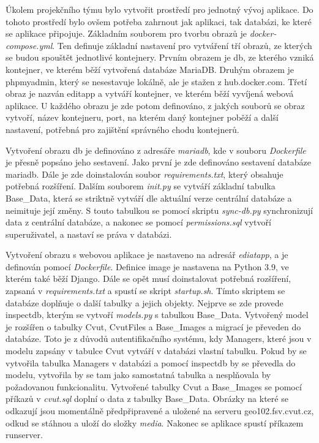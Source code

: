 Úkolem projekčního týmu bylo vytvořit prostředí pro jednotný vývoj
aplikace. Do tohoto prostředí bylo ovšem potřeba zahrnout jak aplikaci,
tak databázi, ke které se aplikace připojuje. Základním souborem pro
tvorbu obrazů je \emph{docker-compose.yml}. Ten definuje základní
nastavení pro vytváření tří obrazů, ze kterých se budou spouštět
jednotlivé kontejnery. Prvním obrazem je db, ze kterého vzniká
kontejner, ve kterém běží vytvořená databáze MariaDB. Druhým obrazem
je phpmyadmin, který se nesestavuje lokálně, ale je stažen z
hub.docker.com. Třetí obraz je nazván editapp a vytváří kontejner, ve
kterém běží vyvíjená webová aplikace. U každého obrazu je zde potom
definováno, z jakých souborů se obraz vytvoří, název kontejneru, port,
na kterém daný kontejner poběží a další nastavení, potřebná pro
zajištění správného chodu kontejnerů.

Vytvoření obrazu db je definováno z adresáře \emph{mariadb}, kde v
souboru \emph{Dockerfile} je přesně popsáno jeho sestavení. Jako první
je zde definováno sestavení databáze mariadb. Dále je zde doinstalován
soubor \emph{requirements.txt}, který obsahuje potřebná
rozšíření. Dalším souborem \emph{init.py} se vytváří základní tabulka
Base\_Data, která se striktně vytváří dle aktuální verze centrální
databáze a neimituje její změny. S touto tabulkou se pomocí skriptu
\emph{sync-db.py} synchronizují data z centrální databáze, a nakonec
se pomocí \emph{permissions.sql} vytvoří superuživatel, a nastaví se
práva v databázi.

Vytvoření obrazu s webovou aplikace je nastaveno na adresář
\emph{ediatapp}, a je definován pomocí \emph{Dockerfile}. Definice
image je nastavena na Python 3.9, ve kterém také běží Django. Dále se
opět musí doinstalovat potřebná rozšíření, zapsaná v
\emph{requirements.txt} a spustí se skript \emph{startup.sh}. Tímto
skriptem se databáze doplňuje o další tabulky a jejich
objekty. Nejprve se zde provede inspectdb, kterým se vytvoří
\emph{models.py} s tabulkou Base\_Data. Vytvořený model je rozšířen o
tabulky Cvut, CvutFiles a Base\_Images a migrací je převeden do
databáze. Toto je z důvodů autentifikačního systému, kdy Managers,
které jsou v modelu zapsány v tabulce Cvut vytváří v databázi vlastní
tabulku. Pokud by se vytvořila tabulka Managers v databázi a pomocí
inspectdb by se převedla do modelu, vytvořila by se tam jako
samostatná tabulka a nesplňovala by požadovanou
funkcionalitu. Vytvořené tabulky Cvut a Base\_Images se pomocí 
příkazů v \emph{cvut.sql} doplní o data z tabulky Base\_Data. Obrázky
na které se odkazují jsou momentálně předpřipravené a uložené na
serveru geo102.fsv.cvut.cz, odkud se stáhnou a uloží do složky
\emph{media}. Nakonec se aplikace spustí příkazem runserver.

